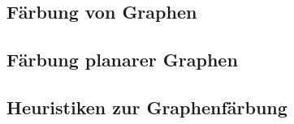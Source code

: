 \documentclass[10pt,a4paper,landscape]{article}
\begin{document}
\begin{multicols*}{2}
\section{ Färbung von Graphen }
    \subsection{ Färbung planarer Graphen }

    \subsection{ Heuristiken zur Graphenfärbung }


\end{multicols*}
\end{document}
